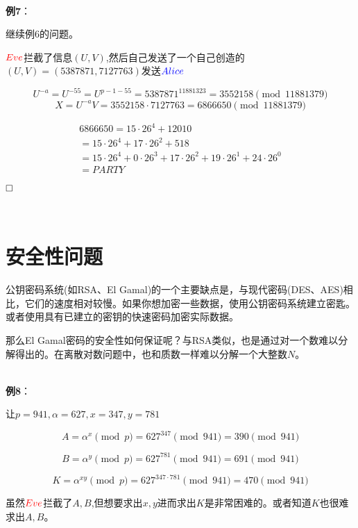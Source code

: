 \documentclass{article}
\begin{document}
~\\

\textbf{例7}：

继续例6的问题。

${\color{red}Eve}$拦截了信息$(U,V)$,然后自己发送了一个自己创造的$(U,V) = (5387871,7127763)$发送${\color{blue}Alice}$

$$U^{-a} = U^{-55} =U^{p -1 -55} = 5387871^{11881323} = 3552158 \pmod{11881379}$$
$$X = U^{-a}V =3552158 \cdot 7127763 = 6866650 \pmod{11881379}$$

$$
\begin{array}{l}
6866650=15 \cdot 26^{4}+12010 \\
=15 \cdot 26^{4}+17 \cdot 26^{2}+518 \\
=15 \cdot 26^{4}+0 \cdot 26^{3}+17 \cdot 26^{2}+19 \cdot 26^{1}+24 \cdot 26^{0} \\
= PARTY
\end{array}
$$


$\hfill\square$ 



~\\

\section{安全性问题}

公钥密码系统(如RSA、El Gamal)的一个主要缺点是，与现代密码(DES、AES)相比，它们的速度相对较慢。如果你想加密一些数据，使用公钥密码系统建立密匙。或者使用具有已建立的密钥的快速密码加密实际数据。

那么El Gamal密码的安全性如何保证呢？与RSA类似，也是通过对一个数难以分解得出的。在离散对数问题中，也和质数一样难以分解一个大整数$N$。

~\\

\textbf{例8}：

让$p=941, \alpha = 627 ,x = 347, y = 781$

$$A = \alpha^{x} \pmod{p} =  627^{347} \pmod{941} = 390 \pmod{941} $$

$$B = \alpha^{y} \pmod{p} =  627^{781} \pmod{941} = 691 \pmod{941} $$

$$K = \alpha^{xy} \pmod{p} =  627^{347 \cdot 781} \pmod{941} = 470 \pmod{941} $$

虽然${\color{red}Eve}$拦截了$A,B$,但想要求出$x,y$进而求出$K$是非常困难的。或者知道$K$也很难求出$A,B$。
\end{document}
